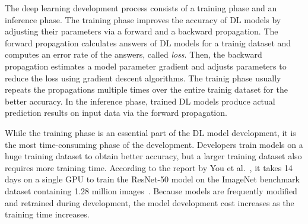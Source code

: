 The deep learning development process consists of a training phase and an
inference phase.
The training phase improves the accuracy of DL models by adjusting their
parameters via a forward and a backward propagation. 
The forward propagation calculates answers of DL models for a trainig dataset
and computes an error rate of the answers, called {\it loss}.
Then, the backward propagation estimates a model parameter gradient and adjusts
parameters to reduce the loss using gradient descent algorithms.
The trainig phase usually repeats the propagations multiple times over the
entire trainig dataset for the better accuracy.
In the inference phase, trained DL models produce actual prediction results on
input data via the forward propagation.

While the training phase is an essential part of the DL model development, it
is the most time-consuming phase of the development.
Developers train models on a huge training dataset to obtain better accuracy,
but a larger training dataset also requires more training time.
According to the report by You et al.~\cite{imagenettraining2017}, it takes 14
days on a single GPU to train the ResNet-50 model on the ImageNet benchmark
dataset containing 1.28 million images~\cite{imagenet2014}.
Because models are frequently modified and retrained during development, the
model development cost increases as the training time increases.

